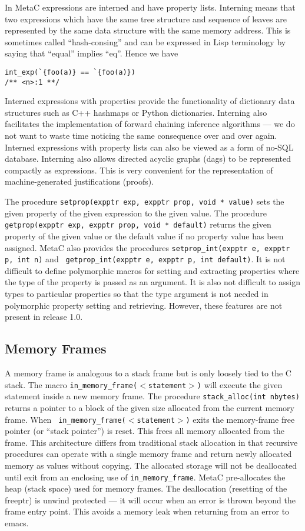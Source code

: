\documentclass{article}
\begin{document}
In MetaC expressions are interned and have property lists.
Interning means that two expressions which have the same tree structure and sequence of leaves are represented by the same data structure with the same memory address.
This is sometimes called ``hash-consing'' and can be expressed in Lisp terminology by saying that ``equal'' implies ``eq''.
Hence we have
\begin{verbatim}
int_exp(`{foo(a)} == `{foo(a)})
/** <n>:1 **/
\end{verbatim}
Interned expressions with properties provide the functionality of dictionary data structures such as C++ hashmaps or Python dictionaries.
Interning also facilitates the implementation of forward chaining inference algorithms --- we do not want to waste time noticing the same
consequence over and over again.  Interned expressions with property lists can also be viewed as a form of no-SQL database.
Interning also allows directed acyclic graphs (dags) to be represented compactly as expressions.  This is very convenient
for the representation of machine-generated justifications (proofs).

The procedure {\tt setprop(expptr exp, expptr prop, void * value)}
sets the given property of the given expression to the given value.
The procedure {\tt getprop(expptr exp, expptr prop, void * default)}
returns the given property of the given value or the default value if
no property value has been assigned.  MetaC also provides the
procedures {\tt setprop\_int(expptr e, expptr p, int n)} and {\tt
  getprop\_int(expptr e, expptr p, int default)}.  It is not difficult
to define polymorphic macros for setting and extracting properties
where the type of the property is passed as an argument.  It is also
not difficult to assign types to particular properties so that the
type argument is not needed in polymorphic property setting and
retrieving.  However, these features are not present in release 1.0.

\subsection{Memory Frames}
\label{sec:memory}

A memory frame is analogous to a stack frame but is only loosely tied
to the C stack.  The macro {\tt in\_memory\_frame($<$statement$>$)}
will execute the given statement inside a new memory frame.  The
procedure {\tt stack\_alloc(int nbytes)} returns a pointer to a block
of the given size allocated from the current memory frame. When {\tt
  in\_memory\_frame($<$statement$>$)} exits the memory-frame free
pointer (or ``stack pointer'') is reset.  This frees all memory
allocated from the frame.  This architecture differs from traditional
stack allocation in that recursive procedures can operate with a
single memory frame and return newly allocated memory as values
without copying.  The allocated storage will not be deallocated until
exit from an enclosing use of {\tt in\_memory\_frame}.  MetaC
pre-allocates the heap (stack space) used for memory frames.  The
deallocation (resetting of the freeptr) is unwind protected --- it
will occur when an error is thrown beyond the frame entry point.  This
avoids a memory leak when returning from an error to emacs.
\end{document}

